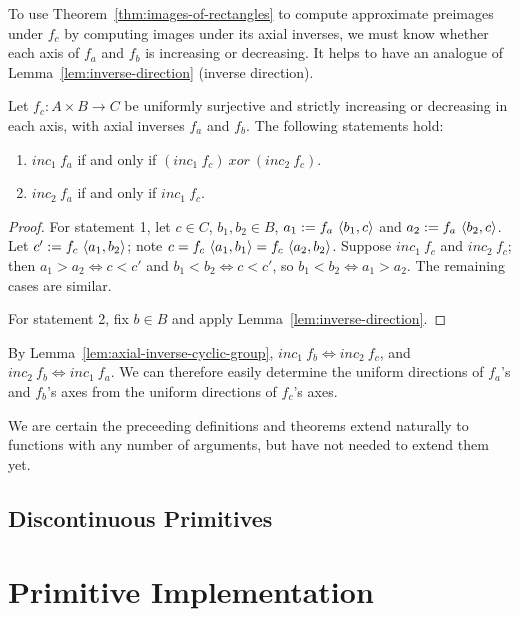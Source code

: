 To use Theorem~\ref{thm:images-of-rectangles} to compute approximate preimages under $f_c$ by computing images under its axial inverses, we must know whether each axis of $f_a$ and $f_b$ is increasing or decreasing.
It helps to have an analogue of Lemma~\ref{lem:inverse-direction} (inverse direction).

\begin{theorem}
Let $f_c : A \times B \to C$ be uniformly surjective and strictly increasing or decreasing in each axis, with axial inverses $f_a$ and $f_b$.
The following statements hold:
\begin{enumerate}
	\item $inc_1~f_a$ if and only if $(inc_1~f_c)~xor~(inc_2~f_c)$.
	\item $inc_2~f_a$ if and only if $inc_1~f_c$.
\end{enumerate}
\end{theorem}
\begin{proof}
For statement 1, let $c \in C$, $b_1,b_2 \in B$, $a_1 := f_a~\langle{b_1,c}\rangle$ and $a_2 := f_a~\langle{b_2,c}\rangle$.
Let $c' := f_c~\langle{a_1,b_2}\rangle$; note $c = f_c~\langle{a_1,b_1}\rangle = f_c~\langle{a_2,b_2}\rangle$.
Suppose $inc_1~f_c$ and $inc_2~f_c$; then $a_1 > a_2 \iff c < c'$ and $b_1 < b_2 \iff c < c'$, so $b_1 < b_2 \iff a_1 > a_2$.
The remaining cases are similar.

For statement 2, fix $b \in B$ and apply Lemma~\ref{lem:inverse-direction}.
\end{proof}

By Lemma~\ref{lem:axial-inverse-cyclic-group}, $inc_1~f_b \iff inc_2~f_c$, and $inc_2~f_b \iff inc_1~f_a$.
We can therefore easily determine the uniform directions of $f_a$'s and $f_b$'s axes from the uniform directions of $f_c$'s axes.

We are certain the preceeding definitions and theorems extend naturally to functions with any number of arguments, but have not needed to extend them yet.


\subsection{Discontinuous Primitives}

\section{Primitive Implementation}
\label{sec:primitive-implementation}

